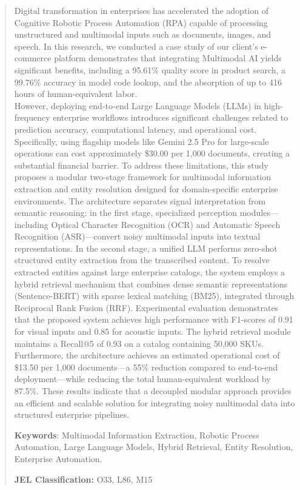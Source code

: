 \documentclass[12pt, a4paper]{article}
\begin{document}
\begin{abstract}
\noindent
Digital transformation in enterprises has accelerated the adoption of Cognitive Robotic Process Automation (RPA) capable of processing unstructured and multimodal inputs such as documents, images, and speech.
In this research, we conducted a case study of our client’s e-commerce platform demonstrates that integrating Multimodal AI yields significant benefits, including a 95.61\% quality score in product search, a 99.76\% accuracy in model code lookup, and the absorption of up to 416 hours of human-equivalent labor. \\
However, deploying end-to-end Large Language Models (LLMs) in high-frequency enterprise workflows introduces significant challenges related to prediction accuracy, computational latency, and operational cost.
Specifically, using flagship models like Gemini 2.5 Pro for large-scale operations can cost approximately \$30.00 per 1,000 documents, creating a substantial financial barrier.
To address these limitations, this study proposes a modular two-stage framework for multimodal information extraction and entity resolution designed for domain-specific enterprise environments.
The architecture separates signal interpretation from semantic reasoning: in the first stage, specialized perception modules—including Optical Character Recognition (OCR) and Automatic Speech Recognition (ASR)—convert noisy multimodal inputs into textual representations.
In the second stage, a unified LLM performs zero-shot structured entity extraction from the transcribed content.
To resolve extracted entities against large enterprise catalogs, the system employs a hybrid retrieval mechanism that combines dense semantic representations (Sentence-BERT) with sparse lexical matching (BM25), integrated through Reciprocal Rank Fusion (RRF).
Experimental evaluation demonstrates that the proposed system achieves high performance with F1-scores of 0.91 for visual inputs and 0.85 for acoustic inputs.
The hybrid retrieval module maintains a Recall@5 of 0.93 on a catalog containing 50,000 SKUs.
Furthermore, the architecture achieves an estimated operational cost of \$13.50 per 1,000 documents—a 55\% reduction compared to end-to-end deployment—while reducing the total human-equivalent workload by 87.5\%. 
These results indicate that a decoupled modular approach provides an efficient and scalable solution for integrating noisy multimodal data into structured enterprise pipelines.

\medskip
\noindent\textbf{Keywords}: Multimodal Information Extraction, Robotic Process Automation, Large Language Models, Hybrid Retrieval, Entity Resolution, Enterprise Automation.

\medskip
\noindent\textbf{JEL Classification:} O33, L86, M15
\end{abstract}
\end{document}
